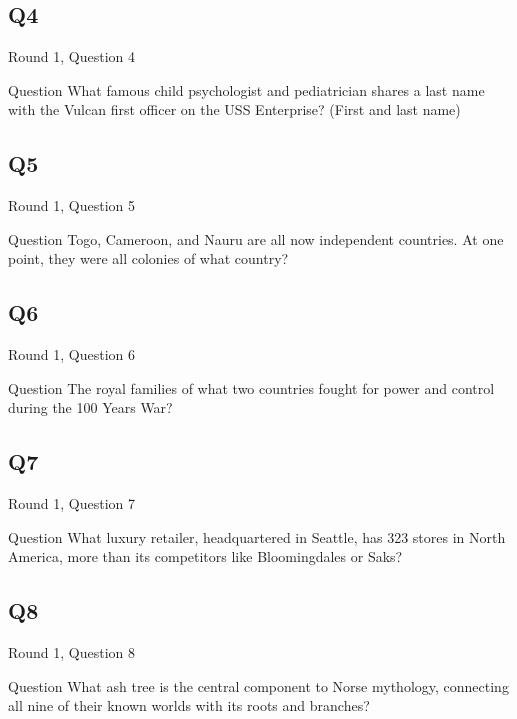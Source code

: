 \documentclass[11pt]{beamer}
\begin{document}
\subsection*{Q4}
\begin{frame}[t]{Round 1, Question 4}
\vspace{2em}
\begin{block}{Question}
What famous child psychologist and pediatrician shares a last name with the Vulcan first officer on the USS Enterprise? (First and last name)
\end{block}
\end{frame}
    

\subsection*{Q5}
\begin{frame}[t]{Round 1, Question 5}
\vspace{2em}
\begin{block}{Question}
Togo, Cameroon, and Nauru are all now independent countries. At one point, they were all colonies of what country\@?
\end{block}
\end{frame}
    

\subsection*{Q6}
\begin{frame}[t]{Round 1, Question 6}
\vspace{2em}
\begin{block}{Question}
The royal families of what two countries fought for power and control during the 100 Years War\@?
\end{block}
\end{frame}
    

\subsection*{Q7}
\begin{frame}[t]{Round 1, Question 7}
\vspace{2em}
\begin{block}{Question}
What luxury retailer, headquartered in Seattle, has 323 stores in North America, more than its competitors like Bloomingdales or Saks\@?
\end{block}
\end{frame}
    

\subsection*{Q8}
\begin{frame}[t]{Round 1, Question 8}
\vspace{2em}
\begin{block}{Question}
What ash tree is the central component to Norse mythology, connecting all nine of their known worlds with its roots and branches\@?
\end{block}
\end{frame}
    
\end{document}

